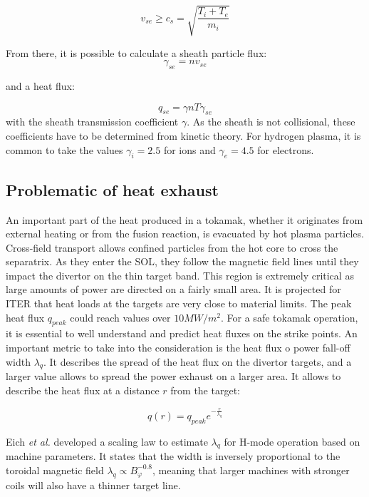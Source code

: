\begin{equation}
	\label{eq:intro_BohmCriterion}
	v_{se} \ge c_s = \sqrt{\frac{T_i+T_e}{m_i}}
\end{equation}

From there, it is possible to calculate a sheath particle flux:
\begin{equation}
	\gamma_{se} = nv_{se}
\end{equation}

and a heat flux:

\begin{equation}
	q_{se} = \gamma n T \gamma_{se}
\end{equation}
with the sheath transmission coefficient $\gamma$. As the sheath is not collisional, these coefficients have to be determined from kinetic theory\cite{Stangeby_2000}. For hydrogen plasma, it is common to take the values $\gamma_i = 2.5$ for ions and $\gamma_e = 4.5$ for electrons.


\subsection{Problematic of heat exhaust}
\label{ssec:intro_heatExhaust}
An important part of the heat produced in a tokamak, whether it originates from external heating or from the fusion reaction, is evacuated by hot plasma particles. Cross-field transport allows confined particles from the hot core to cross the separatrix. As they enter the SOL, they follow the magnetic field lines until they impact the divertor on the thin target band. This region is extremely critical as large amounts of power are directed on a fairly small area. It is projected for ITER that heat loads at the targets are very close to material limits\cite{gunn2017surface}. The peak heat flux $q_{peak}$ could reach values over $10MW/m^2$. For a safe tokamak operation, it is essential to well understand and predict heat fluxes on the strike points. An important metric to take into the consideration is the heat flux o power fall-off width $\lambda_q$. It describes the spread of the heat flux on the divertor targets, and a larger value allows to spread the power exhaust on a larger area. It allows to describe the heat flux at a distance $r$ from the target:

\begin{equation}
	q(r) =  q_{peak}e^{-\frac{r}{\lambda_q}}
\end{equation}

Eich \emph{et al.}\cite{eich2013scaling} developed a scaling law to estimate $\lambda_q$ for H-mode operation based on machine parameters. It states that the width is inversely proportional to the toroidal magnetic field $\lambda_q\propto B_\varphi^{-0.8}$, meaning that larger machines with stronger coils will also have a thinner target line. 










